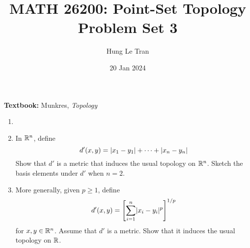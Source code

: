 \documentclass[a4paper, 12pt]{article}
\title{MATH 26200: Point-Set Topology \\ \large Problem Set 3}
\date{20 Jan 2024}
\author{Hung Le Tran}
\begin{document}
\maketitle
\setcounter{section}{3}
\textbf{Textbook:} Munkres, \textit{Topology}
\begin{problem} 
    \begin{enumerate}
    \item []
    \item In $\mathbb{R}^n$, define \begin{equation*}
    d'(x, y) = \lvert x_1 - y_1\rvert + \cdots + \lvert x_n - y_n\rvert
    \end{equation*}
    Show that $d'$ is a metric that induces the usual topology on $\mathbb{R}^n$. Sketch the basis elements under $d'$ when $n = 2$.
    \item More generally, given $p \geq 1$, define \begin{equation*}
    d'(x, y) = \left[\sum_{i=1}^{n} \lvert x_i - y_i\rvert^p\right]^{1/p}
    \end{equation*}
    for $x, y \in \mathbb{R}^n$. Assume that $d'$ is a metric. Show that it induces the usual topology on $\mathbb{R}$.
    \end{enumerate}
\end{problem}
\end{document}
